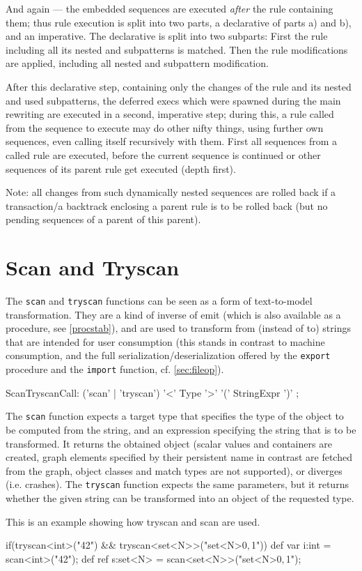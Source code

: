 \begin{warning}
And again --- the embedded sequences are executed \emph{after} the rule containing them;
thus rule execution is split into two parts, a declarative of parts a) and b), and an imperative.
The declarative is split into two subparts:
First the rule including all its nested and subpatterns is matched.
Then the rule modifications are applied, including all nested and subpattern modification.

After this declarative step, containing only the changes of the rule and its nested and used subpatterns,
the deferred execs which were spawned during the main rewriting are executed in a second, imperative step;
during this, a rule called from the sequence to execute may do other nifty things,
using further own sequences, even calling itself recursively with them.
First all sequences from a called rule are executed, before the current sequence is continued or other sequences of its parent rule get executed (depth first).

Note: all changes from such dynamically nested sequences are rolled back if a transaction/a backtrack enclosing a parent rule is to be rolled back (but no pending sequences of a parent of this parent).
\end{warning}


\section{Scan and Tryscan}\label{sec:scantryscan}
The \texttt{scan} and \texttt{tryscan} functions can be seen as a form of text-to-model transformation.
They are a kind of inverse of emit (which is also available as a procedure, see \ref{procstab}), and are used to transform from (instead of to) strings that are intended for user consumption (this stands in contrast to machine consumption, and the full serialization/deserialization offered by the \texttt{export} procedure and the \texttt{import} function, cf. \ref{sec:fileop}).

\begin{rail}
  ScanTryscanCall:
    ('scan' | 'tryscan') '<' Type '>' '(' StringExpr ')'
  ;
\end{rail}

The \texttt{scan} function expects a target type that specifies the type of the object to be computed from the string, and an expression specifying the string that is to be transformed.
It returns the obtained object (scalar values and containers are created, graph elements specified by their persistent name in contrast are fetched from the graph, object classes and match types are not supported), or diverges (i.e. crashes).
The \texttt{tryscan} function expects the same parameters, but it returns whether the given string can be transformed into an object of the requested type.

\begin{example}
	This is an example showing how tryscan and scan are used.
	\begin{grgen}
  if(tryscan<int>("42") && tryscan<set<N>>("set<N>{$0,$1}")) {
    def var i:int = scan<int>("42");
    def ref s:set<N> = scan<set<N>>("set<N>{$0,$1}");
  }
	\end{grgen}
\end{example}
